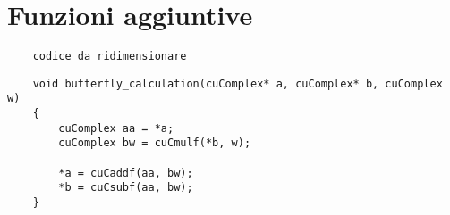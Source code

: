 \chapter{Funzioni aggiuntive}
\begin{lstlisting}
    codice da ridimensionare
\end{lstlisting}

\begin{lstlisting}
    void butterfly_calculation(cuComplex* a, cuComplex* b, cuComplex w)
    {
        cuComplex aa = *a;
        cuComplex bw = cuCmulf(*b, w);
    
        *a = cuCaddf(aa, bw);
        *b = cuCsubf(aa, bw);
    }    
\end{lstlisting}